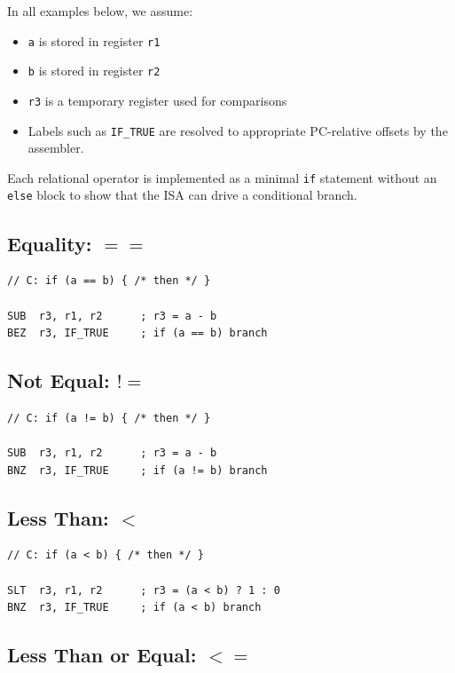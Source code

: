 \documentclass[12pt]{report}
\begin{document}
In all examples below, we assume:
\begin{itemize}
    \item \texttt{a} is stored in register \texttt{r1}
    \item \texttt{b} is stored in register \texttt{r2}
    \item \texttt{r3} is a temporary register used for comparisons
    \item Labels such as \texttt{IF\_TRUE} are resolved to appropriate PC-relative offsets by the assembler.
\end{itemize}

Each relational operator is implemented as a minimal \texttt{if} statement without an \texttt{else} block to show that the ISA can drive a conditional branch.

\subsection*{Equality: \texorpdfstring{$==$}{==}}

\begin{lstlisting}
// C: if (a == b) { /* then */ }

SUB  r3, r1, r2      ; r3 = a - b
BEZ  r3, IF_TRUE     ; if (a == b) branch
\end{lstlisting}

\subsection*{Not Equal: \texorpdfstring{$!=$}{!=}}

\begin{lstlisting}
// C: if (a != b) { /* then */ }

SUB  r3, r1, r2      ; r3 = a - b
BNZ  r3, IF_TRUE     ; if (a != b) branch
\end{lstlisting}

\subsection*{Less Than: \texorpdfstring{$<$}{<}}

\begin{lstlisting}
// C: if (a < b) { /* then */ }

SLT  r3, r1, r2      ; r3 = (a < b) ? 1 : 0
BNZ  r3, IF_TRUE     ; if (a < b) branch
\end{lstlisting}

\subsection*{Less Than or Equal: \texorpdfstring{$<=$}{<=}}
\end{document}
